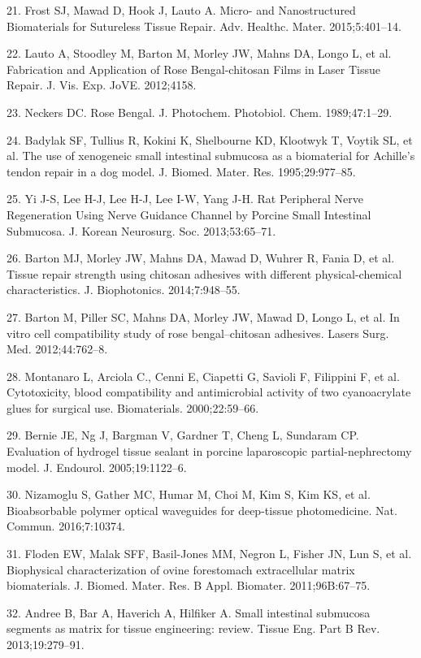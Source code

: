21. Frost SJ, Mawad D, Hook J, Lauto A. Micro- and Nanostructured Biomaterials for Sutureless Tissue Repair. Adv. Healthc. Mater. 2015;5:401–14. 

22. Lauto A, Stoodley M, Barton M, Morley JW, Mahns DA, Longo L, et al. Fabrication and Application of Rose Bengal-chitosan Films in Laser Tissue Repair. J. Vis. Exp. JoVE. 2012;4158. 

23. Neckers DC. Rose Bengal. J. Photochem. Photobiol. Chem. 1989;47:1–29. 

24. Badylak SF, Tullius R, Kokini K, Shelbourne KD, Klootwyk T, Voytik SL, et al. The use of xenogeneic small intestinal submucosa as a biomaterial for Achille’s tendon repair in a dog model. J. Biomed. Mater. Res. 1995;29:977–85. 

25. Yi J-S, Lee H-J, Lee H-J, Lee I-W, Yang J-H. Rat Peripheral Nerve Regeneration Using Nerve Guidance Channel by Porcine Small Intestinal Submucosa. J. Korean Neurosurg. Soc. 2013;53:65–71. 

26. Barton MJ, Morley JW, Mahns DA, Mawad D, Wuhrer R, Fania D, et al. Tissue repair strength using chitosan adhesives with different physical-chemical characteristics. J. Biophotonics. 2014;7:948–55. 

27. Barton M, Piller SC, Mahns DA, Morley JW, Mawad D, Longo L, et al. In vitro cell compatibility study of rose bengal–chitosan adhesives. Lasers Surg. Med. 2012;44:762–8. 

28. Montanaro L, Arciola C., Cenni E, Ciapetti G, Savioli F, Filippini F, et al. Cytotoxicity, blood compatibility and antimicrobial activity of two cyanoacrylate glues for surgical use. Biomaterials. 2000;22:59–66. 

29. Bernie JE, Ng J, Bargman V, Gardner T, Cheng L, Sundaram CP. Evaluation of hydrogel tissue sealant in porcine laparoscopic partial-nephrectomy model. J. Endourol. 2005;19:1122–6. 

30. Nizamoglu S, Gather MC, Humar M, Choi M, Kim S, Kim KS, et al. Bioabsorbable polymer optical waveguides for deep-tissue photomedicine. Nat. Commun. 2016;7:10374. 

31. Floden EW, Malak SFF, Basil-Jones MM, Negron L, Fisher JN, Lun S, et al. Biophysical characterization of ovine forestomach extracellular matrix biomaterials. J. Biomed. Mater. Res. B Appl. Biomater. 2011;96B:67–75. 

32. Andree B, Bar A, Haverich A, Hilfiker A. Small intestinal submucosa segments as matrix for tissue engineering: review. Tissue Eng. Part B Rev. 2013;19:279–91. 

